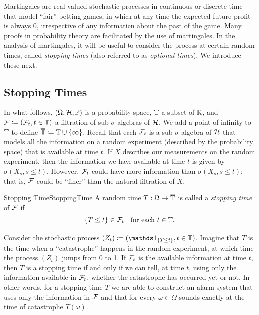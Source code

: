 Martingales are real-valued stochastic processes in continuous or discrete time that model ``fair'' betting games, in which at any time the expected future profit is always 0, irrespective of any information about the past of the game. Many proofs in probability theory are facilitated by the use of martingales. In the analysis of martingales, it will be useful to consider the process at certain random times, called \textit{stopping times} (also referred to as \textit{optional times}). We introduce these next.

\subsection{Stopping Times}
In what follows, $(\Omega, \mathcal{H}, \mathbb{P})$ is a probability space, $\mathbb{T}$ a subset of $\mathbb{R}$, and $\mathcal{F} \coloneqq (\mathcal{F}_t, t \in \mathbb{T})$ a filtration of sub $\sigma$-algebras of $\mathcal{H}$. We add a point of infinity to $\mathbb{T}$ to define $\overline{\mathbb{T}} \coloneqq \mathbb{T} \cup \{\infty\}$. Recall that each $\mathcal{F}_t$ is a sub $\sigma$-algebra of $\mathcal{H}$ that models all the information on a random experiment (described by the probability space) that is available at time $t$. If $X$ describes our measurements on the random experiment, then the information we have available at time $t$ is given by $\sigma(X_s, s \leq t)$. However, $\mathcal{F}_t$ could have more information than $\sigma(X_s, s \leq t)$; that is, $\mathcal{F}$ could be ``finer'' than the natural filtration of $X$.

\begin{defn}{Stopping Time}{StoppingTime}
	A random time $T : \Omega \to \overline{\mathbb{T}}$ is called a \emph{stopping time} of $\mathcal{F}$ if
	\begin{equation*}
		\{T \le t\} \in \mathcal{F}_t \quad \text{for each } t \in \mathbb{T}.
	\end{equation*}
\end{defn}

Consider the stochastic process $(Z_t) \idef (\I_{\set{T \leq t}}, t \in \bb{T})$. Imagine that $T$ is the time when a ``catastrophe'' happens in the random experiment, at which time the process $(Z_t)$ jumps from 0 to 1. If $\mathcal{F}_t$ is the available information at time $t$, then $T$ is a stopping time if and only if we can tell, at time $t$, using only the information available in $\mathcal{F}_t$, whether the catastrophe has occurred yet or not. In other words, for a stopping time $T$ we are able to construct an alarm system that uses only the information in $\mathcal{F}$ and that for every $\omega \in \Omega$ sounds exactly at the time of catastrophe $T(\omega)$.

